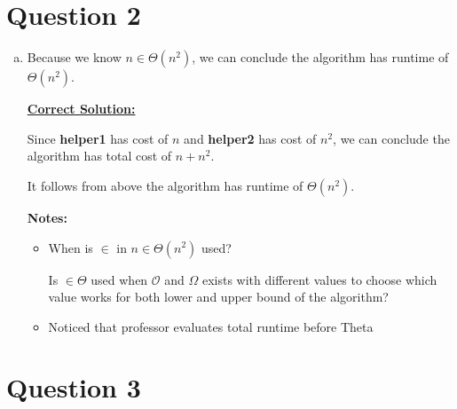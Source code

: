 \documentclass[12pt]{article}
\begin{document}
\section*{Question 2}
\begin{enumerate}[a.]
    \item

    Because we know $n \in \Theta(n^2)$, we can conclude the algorithm has runtime
    of $\Theta(n^2)$.

    \bigskip

    \begin{mdframed}
        \underline{\textbf{Correct Solution:}}

        \bigskip

        \color{red}
        Since \textbf{helper1} has cost of $n$ and \textbf{helper2} has cost of $n^2$,
        we can conclude the algorithm has total cost of $n + n^2$.

        \bigskip

        It follows from above the algorithm has runtime of $\Theta(n^2)$.

        \color{black}

    \end{mdframed}

    \textbf{Notes:}

    \begin{itemize}
        \item When is $\in$ in $n \in \Theta(n^2)$ used?

        \bigskip

        Is $\in \Theta$ used when $\mathcal{O}$ and $\Omega$ exists with
        different values to choose which value works for both lower and upper
        bound of the algorithm?

        \item Noticed that professor evaluates total runtime before Theta
    \end{itemize}

\end{enumerate}

\section*{Question 3}
\end{document}
